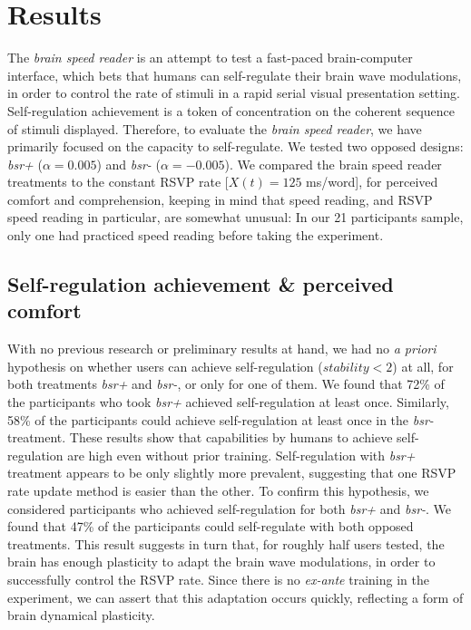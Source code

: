 \section{Results}
\label{results}
The {\it brain speed reader} is an attempt to test a fast-paced brain-computer interface, which bets that humans can self-regulate their brain wave modulations, in order to control the rate of stimuli in a rapid serial visual presentation setting. Self-regulation achievement is a token of concentration on the coherent sequence of stimuli displayed. Therefore, to evaluate the {\it brain speed reader}, we have primarily focused on the capacity to self-regulate. We tested two opposed designs: {\it bsr+} ($\alpha = 0.005$) and {\it bsr-} ($\alpha = -0.005$). We compared the brain speed reader treatments to the constant RSVP rate [$X(t)  = 125$ ms/word], for perceived comfort and comprehension, keeping in mind that speed reading, and RSVP speed reading in particular, are somewhat unusual: In our 21 participants sample, only one had practiced speed reading before taking the experiment.

\subsection{Self-regulation achievement \& perceived comfort}
With no previous research or preliminary results at hand, we had no {\it a priori} hypothesis on whether users can achieve self-regulation ($stability <  2$) at all, for both treatments  {\it bsr+} and {\it bsr-}, or only for one of them. We found that 72\% of the participants who took {\it bsr+} achieved self-regulation at least once. Similarly, 58\% of the participants could achieve self-regulation at least once in the {\it bsr-} treatment. These results show that capabilities by humans to achieve self-regulation are high even without prior training. Self-regulation with {\it bsr+} treatment appears to be only slightly more prevalent, suggesting that one RSVP rate update method is easier than the other. To confirm this hypothesis, we considered participants who achieved self-regulation for both {\it bsr+} and {\it bsr-}. We found that 47\% of the participants could self-regulate with both opposed treatments. This result suggests in turn that, for roughly half users tested, the brain has enough plasticity to adapt the brain wave modulations, in order to successfully control the RSVP rate. Since there is no {\it ex-ante} training in the experiment, we can assert that this adaptation occurs quickly, reflecting a form of brain dynamical plasticity.


